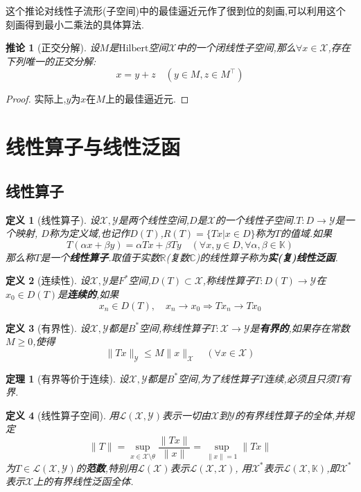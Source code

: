 \documentclass[12pt,a4paper]{article}
\newtheorem{thm}{定理}[subsection]  %
\newtheorem{corollary}{推论}[subsection] %
\newtheorem{definition}{定义}[subsection] %
\begin{document}
这个推论对线性子流形(子空间)中的最佳逼近元作了很到位的刻画,可以利用这个刻画得到最小二乘法的具体算法.
\begin{corollary}[正交分解]
    设$M$是$\mathrm{Hilbert}$空间$\mathscr{X}$中的一个闭线性子空间,那么$\forall x \in \mathscr{X}$,存在下列唯一的正交分解:
    \[x= y+z\quad (y\in M,z\in M^{\top})\]
\end{corollary}
\begin{proof}
    实际上,$y$为$x$在$M$上的最佳逼近元.
\end{proof}


\newpage

\section{线性算子与线性泛函}

\subsection{线性算子}
\begin{definition}[线性算子]
    设$\mathscr{X},\mathscr{Y}$是两个线性空间,$D$是$\mathscr{X}$的一个线性子空间.$T:D\to \mathscr{Y}$是一个映射,
    $D$称为定义域,也记作$D(T)$,$R(T)=\{Tx|x \in D\}$称为$T$的值域.如果
    \[T(\alpha x + \beta y) = \alpha Tx + \beta Ty\quad (\forall x,y \in D,\forall \alpha,\beta \in \mathbb{K})\]
    那么称$T$是一个\textbf{线性算子}.取值于实数$\mathbb{R}$(复数$\mathbb{C}$)的线性算子称为\textbf{实(复)线性泛函}.
\end{definition}
\begin{definition}[连续性]
    设$\mathscr{X},\mathscr{Y}$是$F^*$空间,$D(T)\subset \mathscr{X}$,称线性算子$T:D(T)\to \mathscr{Y}$在$x_0 \in D(T)$是\textbf{连续的},如果
    \[x_n \in D(T),\quad x_n \to x_0\Rightarrow Tx_n\to Tx_0\]
\end{definition}
\begin{definition}[有界性]
    设$\mathscr{X},\mathscr{Y}$都是$B^*$空间,称线性算子$T:\mathscr{X}\to \mathscr{Y}$是\textbf{有界的},如果存在常数$M\geq 0$,使得
    \[\|Tx\|_{\mathscr{Y}}\leq M\|x\|_{\mathscr{X}} \quad (\forall x \in \mathscr{X})\]
\end{definition}
\begin{thm}[有界等价于连续]
    设$\mathscr{X},\mathscr{Y}$都是$B^*$空间,为了线性算子$T$连续,必须且只须$T$有界.
\end{thm}
\begin{definition}[线性算子空间]
    用$\mathscr{L}(\mathscr{X},\mathscr{Y})$表示一切由$\mathscr{X}$到$\mathscr{Y}$的有界线性算子的全体,并规定
    \[\|T\| = \underset{x\in \mathscr{X}\setminus \theta}{\sup} \frac{\|Tx\|}{\|x\|} = \underset{\|x\|=1}{\sup}\|Tx\| \]
    为$T\in \mathscr{L}(\mathscr{X},\mathscr{Y})$的\textbf{范数},特别用$\mathscr{L}(\mathscr{X})$表示$\mathscr{L}(\mathscr{X},\mathscr{X})$,
    用$\mathscr{X}^*$表示$\mathscr{L}(\mathscr{X},\mathbb{K})$,即$\mathscr{X}^*$表示$\mathscr{X}$上的有界线性泛函全体.
\end{definition}
\end{document}

